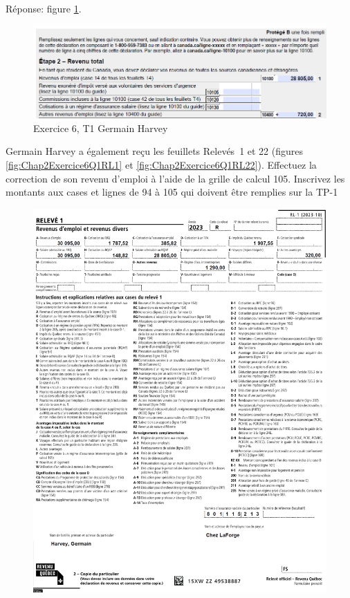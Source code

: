Réponse: figure \ref{fig:Chap2Exercice6Q1aReponse}.
\begin{figure}
	\centering
	\includegraphics[width=.9\textwidth]{exercice/2-6/Q1/a-reponse.png}
	\caption{Exercice 6, T1 Germain Harvey}
	\label{fig:Chap2Exercice6Q1aReponse}
\end{figure}

\begin{sousQuestion}
	Germain Harvey a également reçu les feuillets Relevés~1 et 22 (figures \ref{fig:Chap2Exercice6Q1RL1} et \ref{fig:Chap2Exercice6Q1RL22}). Effectuez la correction de son revenu d'emploi à l'aide de la grille de calcul 105. Inscrivez les montants aux cases et lignes de 94 à 105 qui doivent être remplies sur la TP-1
		\begin{figure}
		\centering
		\includegraphics[width=.9\textwidth]{exercice/2-6/Q1/b-RL1.png}

\end{figure}
\end{sousQuestion}
